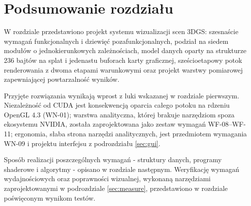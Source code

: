 \section{Podsumowanie rozdziału}
\label{sec:podsumowanie3}
 
W rozdziale przedstawiono projekt systemu wizualizacji scen 3DGS:
szesnaście wymagań funkcjonalnych i dziewięć pozafunkcjonalnych, podział na
siedem modułów o jednokierunkowych zależnościach, model danych oparty na
strukturze 236 bajtów na splat i jedenastu buforach karty graficznej,
sześcioetapowy potok renderowania z dwoma etapami warunkowymi oraz projekt
warstwy pomiarowej zapewniającej powtarzalność wyników.
 
Przyjęte rozwiązania wynikają wprost z luki wskazanej w rozdziale
pierwszym. Niezależność od CUDA jest konsekwencją oparcia całego potoku na
rdzeniu OpenGL 4.3 (WN-01); warstwa analityczna, której brakuje narzędziom
spoza ekosystemu NVIDIA, została zaprojektowana jako zestaw wymagań
WF-08--WF-11; ergonomia, słaba strona narzędzi analitycznych, jest
przedmiotem wymagania WN-09 i projektu interfejsu z podrozdziału \ref{sec:gui}.
 
Sposób realizacji poszczególnych wymagań  -  struktury danych, programy
shaderowe i algorytmy  -  opisano w rozdziale następnym. Weryfikację
wymagań wydajnościowych oraz poprawności wizualnej, wykonaną narzędziami
zaprojektowanymi w podrozdziale \ref{sec:measure}, przedstawiono
w rozdziale poświęconym wynikom testów.